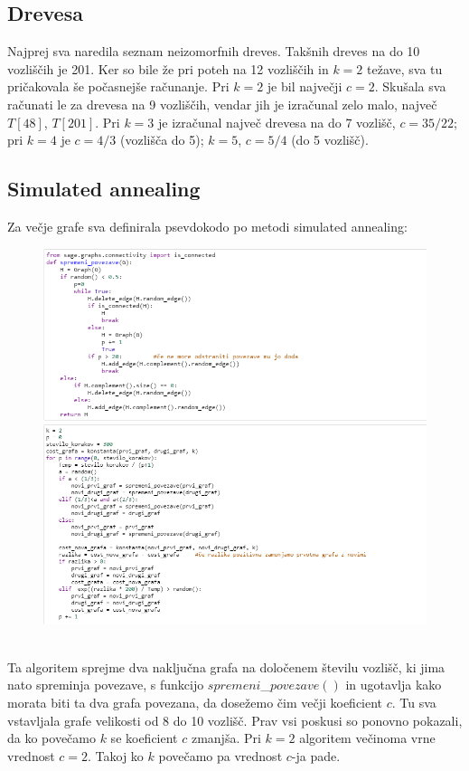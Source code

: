 \documentclass[12pt, a4paper]{article}
\begin{document}
\subsection{Drevesa}
Najprej sva naredila seznam neizomorfnih dreves. Takšnih dreves na do 10 vozliščih je 201. Ker so bile že pri poteh na 12 vozliščih in $k=2$ težave, sva tu pričakovala še počasnejše računanje. Pri $k=2$ je bil največji $c=2$. Skušala sva računati le za drevesa na 9 vozliščih, vendar jih je izračunal zelo malo, največ $T[48]$, $T[201]$. Pri $k=3$ je izračunal največ drevesa na do 7 vozlišč, $c=35/22$; pri $k=4$ je $c=4/3$ (vozlišča do 5); $k=5$, $c=5/4$ (do 5 vozlišč). \\
\pagebreak

\subsection{Simulated annealing}
Za večje grafe sva definirala psevdokodo po metodi simulated annealing:
\begin{figure}[h!]
\centering
\includegraphics[width=13.5cm]{slika_2}
\includegraphics[width=13.5cm]{slika_3}
\end{figure} \\
Ta algoritem sprejme dva naključna grafa na določenem številu vozlišč, ki jima nato spreminja povezave, s funkcijo $spremeni$\_$povezave()$ in ugotavlja kako morata biti ta dva grafa povezana, da dosežemo čim večji koeficient $c$. Tu sva vstavljala grafe velikosti od 8 do 10 vozlišč. Prav vsi poskusi so ponovno pokazali, da ko povečamo $k$ se koeficient $c$ zmanjša. Pri $k=2$ algoritem večinoma vrne vrednost $c=2$. Takoj ko $k$ povečamo pa vrednost $c$-ja pade. 
\end{document}
